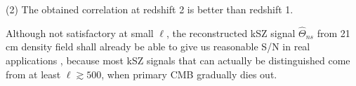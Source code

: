 (2) The obtained correlation at redshift 2 is better than redshift 1.

Although not satisfactory at small $\ell$, the reconstructed kSZ signal $\hat \Theta_{ns}$ 
from 21 cm density field shall already be able to give us reasonable S/N in real applications  
, because most kSZ signals that can actually be distinguished come from at least $\ell \gtrsim 500$, when primary CMB gradually dies out. 



